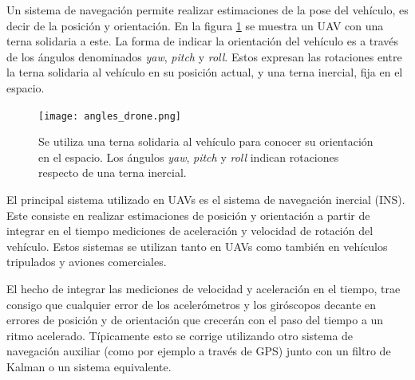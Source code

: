 
Un sistema de navegación permite realizar estimaciones de la pose del vehículo, es decir de la posición y orientación. En la figura \ref{fig:angles_drone} se muestra un UAV con una terna solidaria a este. La forma de indicar la orientación del vehículo es a través de los ángulos denominados \textit{yaw}, \textit{pitch} y \textit{roll}. Estos expresan las rotaciones entre la terna solidaria al vehículo en su posición actual, y una terna inercial, fija en el espacio.

\begin{figure}[htb]
    \centering
    \texttt{[image: angles\_drone.png]}
    \caption{Se utiliza una terna solidaria al vehículo para conocer su orientación en el espacio. Los ángulos \textit{yaw}, \textit{pitch} y \textit{roll} indican rotaciones respecto de una terna inercial.}
    \label{fig:angles_drone}    
\end{figure}

El principal sistema utilizado en UAVs es el sistema de navegación inercial (INS). Este consiste en realizar estimaciones de posición y orientación a partir de integrar en el tiempo mediciones de aceleración y velocidad de rotación del vehículo. %
Estos sistemas se utilizan tanto en UAVs como también en vehículos tripulados y aviones comerciales.

El hecho de integrar las mediciones de velocidad y aceleración en el tiempo, trae consigo que cualquier error de los acelerómetros y los giróscopos decante en errores de posición y de orientación que crecerán con el paso del tiempo a un ritmo acelerado. Típicamente esto se corrige utilizando otro sistema de navegación auxiliar (como por ejemplo a través de GPS) junto con un filtro de Kalman o un sistema equivalente. %

